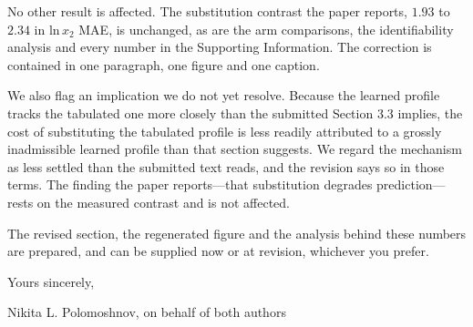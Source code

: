 \documentclass[11pt]{article}
\begin{document}
No other result is affected. The substitution contrast the paper reports, $1.93$ to $2.34$ in
ln\,$x_2$ MAE, is unchanged, as are the arm comparisons, the identifiability analysis and every
number in the Supporting Information. The correction is contained in one paragraph, one figure and
one caption.

We also flag an implication we do not yet resolve. Because the learned profile tracks the tabulated
one more closely than the submitted Section 3.3 implies, the cost of substituting the tabulated
profile is less readily attributed to a grossly inadmissible learned profile than that section
suggests. We regard the mechanism as less settled than the submitted text reads, and the revision
says so in those terms. The finding the paper reports---that substitution degrades
prediction---rests on the measured contrast and is not affected.

The revised section, the regenerated figure and the analysis behind these numbers are prepared,
and can be supplied now or at revision, whichever you prefer.

\vspace{3mm}
\noindent Yours sincerely,

\vspace{5mm}
\noindent Nikita L. Polomoshnov, on behalf of both authors
\end{document}
